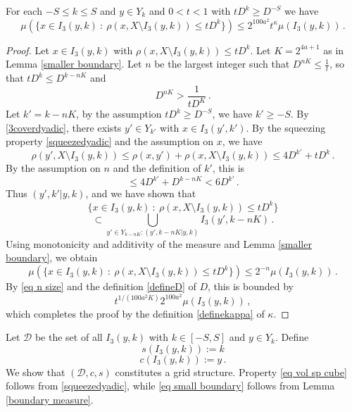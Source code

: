 \begin{lemma}\label{boundary measure}
 For each $-S\le k\le S$ and $y\in Y_k$ and $0<t<1$
 with $tD^k\ge D^{-S}$ we have
    \begin{equation}
        \label{old small boundary}
        \mu(\{x \in I_3(y,k) \ : \ \rho(x, X \setminus I_3(y,k)) \leq t D^{k}\}) \le 2^{100a^2} t^\kappa \mu(I_3(y,k))\,.
    \end{equation}
\end{lemma}
\begin{proof}
Let $x\in I_3(y,k)$ with  $\rho(x, X \setminus I_3(y,k)) \leq t D^{k}$. Let $K = 2^{4a+1}$ as in Lemma \ref{smaller boundary}.
Let $n$ be the largest integer such that
$D^{nK} \le \frac{1}{t}$, so that $tD^k \le D^{k-nK}$ and
\begin{equation}
\label{eq n size}
    D^{nK} > \frac{1}{tD^K}\,.
\end{equation}
Let $k' = k - nK$, by the assumption $tD^k \ge D^{-S}$, we have $k' \ge -S$. By \eqref{3coverdyadic}, there exists $y' \in Y_{k'}$ with $x \in I_3(y',k')$. By the squeezing property \eqref{squeezedyadic} and the assumption on $x$, we have
$$
    \rho(y', X \setminus I_3(y,k)) \le \rho(x,y') + \rho(x, X \setminus I_3(y,k)) \le 4 D^{k'} + t D^{k}\,.
$$
By the assumption on $n$ and the definition of $k'$, this is
$$
    \le 4D^{k'} + D^{k - nK} < 6D^{k'}\,.
$$
Thus $(y',k'|y,k)$, and we have shown that
$$
    \{x \in I_3(y,k) \ : \ \rho(x, X \setminus I_3(y,k)) \leq t D^{k}\}
$$
$$
    \subset \bigcup_{y'\in Y_{k-nK}: (y',k-nK|y,k)}I_3(y',k-nK)\,.
$$
Using monotonicity and additivity of the measure and Lemma \ref{smaller boundary}, we obtain
$$
    \mu(\{x \in I_3(y,k) \ : \ \rho(x, X \setminus I_3(y,k)) \leq t D^{k}\}) \le 2^{-n} \mu(I_3(y,k))\,.
$$
By \eqref{eq n size} and the definition \eqref{defineD} of $D$, this is bounded by
$$
    t^{1/(100a^2 K)} 2^{100a^2} \mu(I_3(y,k))\,,
$$
which completes the proof by the definition \eqref{definekappa} of $\kappa$.
\end{proof}

Let $\mathcal{D}$ be the set of all $I_3(y,k)$ with $k\in [-S,S]$ and
$y\in Y_k$. Define
\begin{equation}
s(I_3(y,k)):=k
\end{equation}
\begin{equation}
c(I_3(y,k)):=y\,.
\end{equation}
We show that $(\mathcal{D},c,s)$ constitutes a grid structure. Property \eqref{eq vol sp cube}
follows from \eqref{squeezedyadic}, while \eqref{eq small boundary} follows from Lemma \ref{boundary measure}.

